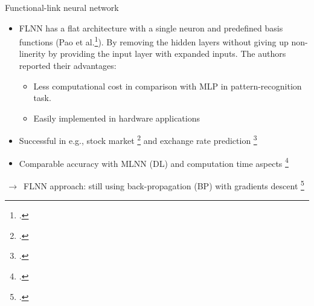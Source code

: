 \documentclass{beamer}
\begin{document}
\begin{frame}{Functional-link neural network}
	\begin{itemize}
		\item{
			 \small FLNN has a flat architecture with a single neuron and predefined basis functions (Pao et al.\footcite{Yoh-Han Pao 1989}). By removing the hidden layers without giving up non-linerity by providing the input layer with expanded inputs. The authors reported their advantages: 
			\begin{itemize}
				\item {
					\small Less computational cost in comparison with MLP in pattern-recognition task.
				}
				\item {
					\small Easily implemented in hardware applications
				}
			\end{itemize}
		}
		\item{
			\small  Successful in e.g., stock market \footcite{Majhi et al. 2009} and exchange rate prediction \footcite{Majhi et al. 2012}
		}
		\item{
			\small  Comparable accuracy with MLNN (DL) and computation time aspects \footcite{Khandelwal et al. 2015, Sahoo et al. 2018}
		}		
	\end{itemize}
	
	$\,\to\,$ FLNN approach: still using back-propagation (BP) with gradients descent \footcite{Dehuri, Satchidananda, and Sung-Bae Cho 2010}
\end{frame}
\end{document}
